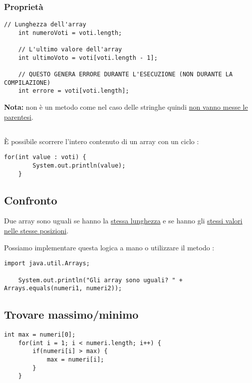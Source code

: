 \documentclass[../main.tex]{subfiles}
\begin{document}
\vspace{0.5cm}
\subsubsection{Proprietà}
\begin{lstlisting}[style=java]
    // Lunghezza dell'array
    int numeroVoti = voti.length;

    // L'ultimo valore dell'array
    int ultimoVoto = voti[voti.length - 1];

    // QUESTO GENERA ERRORE DURANTE L'ESECUZIONE (NON DURANTE LA COMPILAZIONE)
    int errore = voti[voti.length];
\end{lstlisting}
\textbf{Nota:}  non è un metodo come nel caso delle stringhe quindi \underline{non vanno messe le parentesi}.

\subsection{}
È possibile scorrere l'intero contenuto di un array con un ciclo :
\begin{lstlisting}[style=java]
    for(int value : voti) {
        System.out.println(value);
    }
\end{lstlisting}

\vspace{0.5cm}
\subsection{Confronto}
Due array sono uguali se hanno la \underline{stessa lunghezza} e se hanno gli \underline{stessi valori nelle stesse posizioni}.

Possiamo implementare questa logica a mano o utilizzare il metodo :
\begin{lstlisting}[style=java]
    import java.util.Arrays;

    System.out.println("Gli array sono uguali? " + Arrays.equals(numeri1, numeri2));
\end{lstlisting}

\vspace{0.5cm}
\subsection{Trovare massimo/minimo}
\begin{lstlisting}[style=java]
    int max = numeri[0];
    for(int i = 1; i < numeri.length; i++) {
        if(numeri[i] > max) {
            max = numeri[i];
        }
    }
\end{lstlisting}
\end{document}
